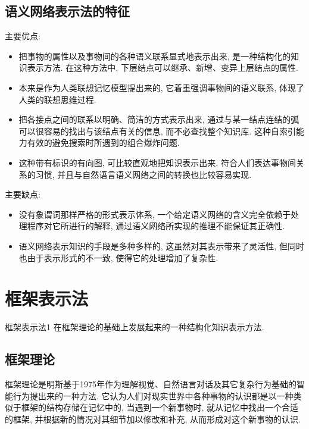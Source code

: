 \subsection{语义网络表示法的特征}
    主要优点:
\begin{itemize}
    \item {} 把事物的属性以及事物间的各种语义联系显式地表示出来, 是一种结构化的知识表示方法. 在这种方法中, 下层结点可以继承、新增、变异上层结点的属性.
    \item {} 本来是作为人类联想记忆模型提出来的, 它着重强调事物间的语义联系, 体现了人类的联想思维过程.
    \item {} 把各接点之间的联系以明确、简洁的方式表示出来, 通过与某一结点连结的弧可以很容易的找出与该结点有关的信息, 而不必查找整个知识库. 这种自索引能力有效的避免搜索时所遇到的组合爆炸问题.
    \item {} 这种带有标识的有向图, 可比较直观地把知识表示出来, 符合人们表达事物间关系的习惯, 并且与自然语言语义网络之间的转换也比较容易实现.
\end{itemize}
主要缺点:
\begin{itemize}
    \item {} 没有象谓词那样严格的形式表示体系, 一个给定语义网络的含义完全依赖于处理程序对它所进行的解释, 通过语义网络所实现的推理不能保证其正确性.
    \item {} 语义网络表示知识的手段是多种多样的, 这虽然对其表示带来了灵活性, 但同时也由于表示形式的不一致, 使得它的处理增加了复杂性.
\end{itemize}
\section{框架表示法}
\begin{mydef}{框架表示法}{1}
    在框架理论的基础上发展起来的一种结构化知识表示方法.
\end{mydef}
%
%
%
%
\subsection{框架理论}
    框架理论是明斯基于1975年作为理解视觉、自然语言对话及其它复杂行为基础的智能行为提出来的一种方法.
它认为人们对现实世界中各种事物的认识都是以一种类似于框架的结构存储在记忆中的, 当遇到一个新事物时, 就从记忆中找出一个合适的框架, 并根据新的情况对其细节加以修改和补充, 从而形成对这个新事物的认识.

